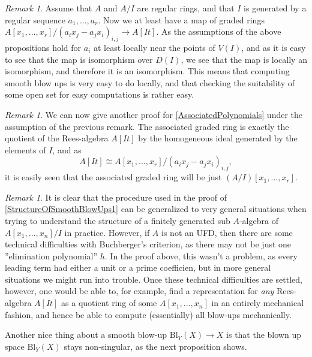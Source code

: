\documentclass[12pt,a4paper,leqno]{article}
\newcommand{\bl}{\mathrm{Bl}}
\newcommand{\fref}[1]{\hyperref[{#1}]{\ref*{#1}}}
\theoremstyle{plain}
\theoremstyle{definition}
\theoremstyle{remark}
\newtheorem{rem}[theo]{Remark}
\begin{document}
\begin{rem}
Assume that $A$ and $A/I$ are regular rings, and that $I$ is generated by a regular sequence $a_1,...,a_r$. Now we at least have a map of graded rings $A[x_1,...,x_r]/(a_i x_j - a_j x_i)_{i,j} \to A[It]$. As the assumptions of the above propositions hold for $a_i$ at least locally near the points of $V(I)$, and as it is easy to see that the map is isomorphism over $D(I)$, we see that the map is locally an isomorphism, and therefore it is an isomorphism. This means that computing smooth blow ups is very easy to do locally, and that checking the suitability of some open set for easy computations is rather easy.
\end{rem}

\begin{rem}
We can now give another proof for \fref{AssociatedPolynomials} under the assumption of the previous remark. The associated graded ring is exactly the quotient of the Rees-algebra $A[It]$ by the homogeneous ideal generated by the elements of $I$, and as 
\begin{equation*}
A[It] \cong A[x_1,...,x_r]/(a_i x_j - a_j x_i)_{i,j},
\end{equation*}
it is easily seen that the associated graded ring will be just $(A/I)[x_1,...,x_r]$.
\end{rem}

\begin{rem}
It is clear that the procedure used in the proof of \fref{StructureOfSmoothBlowUps1} can be generalized to very general situations when trying to understand the structure of a finitely generated sub $A$-algebra of $A[x_1,...,x_n]/I$ in practice. However, if $A$ is not an UFD, then there are some technical difficulties with Buchberger's criterion, as there may not be just one ''elimination polynomial'' $h$. In the proof above, this wasn't a problem, as every leading term had either a unit or a prime coefficien, but in more general situations we might run into trouble. Once these technical difficulties are settled, however, one would be able to, for example, find a representation for \emph{any} Rees-algebra $A[It]$ as a quotient ring of some $A[x_1,...,x_n]$ in an entirely mechanical fashion, and hence be able to compute (essentially) all blow-ups mechanically.
\end{rem}

Another nice thing about a smooth blow-up $\bl_Y (X) \to X$ is that the blown up space $\bl_Y (X)$ stays non-singular, as the next proposition shows.
\end{document}
